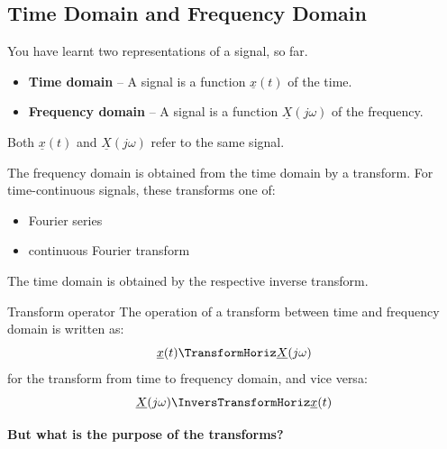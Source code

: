 \begin{refsection}
\subsection{Time Domain and Frequency Domain}

You have learnt two representations of a signal, so far.
\begin{itemize}
	\item {} \textbf{Time domain} -- A signal is a function $\underline{x}(t)$ of the time.
	\item {} \textbf{Frequency domain} -- A signal is a function $\underline{X}(j \omega)$ of the frequency.
\end{itemize}
Both $\underline{x}(t)$ and $\underline{X}(j \omega)$ refer to the same signal. 

The frequency domain is obtained from the time domain by a transform. For time-continuous signals, these transforms one of:
\begin{itemize}
	\item Fourier series
	\item continuous Fourier transform
\end{itemize}
The time domain is obtained by the respective inverse transform.

\begin{definition}{Transform operator}
	The operation of a transform between time and frequency domain is written as:
	\begin{equation}
		\underline{x}(t) \TransformHoriz \underline{X}(j \omega)
	\end{equation}
	for the transform from time to frequency domain, and vice versa:
	\begin{equation}
		\underline{X}(j \omega) \InversTransformHoriz \underline{x}(t)
	\end{equation}
\end{definition}

\textbf{But what is the purpose of the transforms?}

\begin{figure}[H]
	\centering
\end{figure}
\end{refsection}
